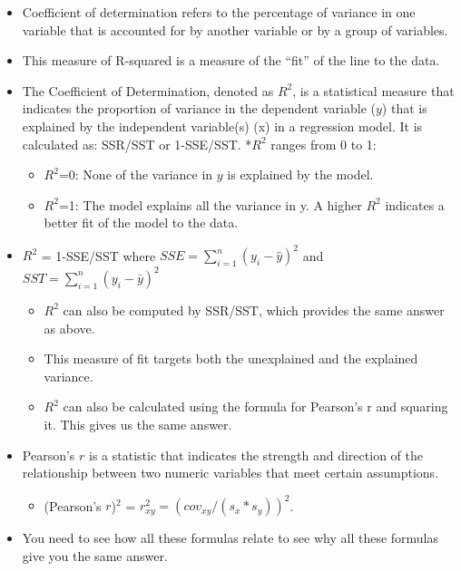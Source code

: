 \documentclass[
  letterpaper,
  DIV=11,
  numbers=noendperiod]{scrreprt}
\providecommand{\tightlist}{%
  \setlength{\itemsep}{0pt}\setlength{\parskip}{0pt}}\usepackage{longtable,booktabs,array}
\begin{document}
\begin{itemize}
\item
  Coefficient of determination refers to the percentage of variance in
  one variable that is accounted for by another variable or by a group
  of variables.
\item
  This measure of R-squared is a measure of the ``fit'' of the line to
  the data.
\item
  The Coefficient of Determination, denoted as \(R^2\), is a statistical
  measure that indicates the proportion of variance in the dependent
  variable (\(y\)) that is explained by the independent variable(s) (x)
  in a regression model. It is calculated as: SSR/SST or 1-SSE/SST.
  *\(R^2\) ranges from 0 to 1:

  \begin{itemize}
  \tightlist
  \item
    \(R^2\)=0: None of the variance in \(y\) is explained by the model.
  \item
    \(R^2\)=1: The model explains all the variance in y. A higher
    \(R^2\) indicates a better fit of the model to the data.
  \end{itemize}
\item
  \(R^2\) = 1-SSE/SST where \(SSE = \sum^n_{i=1}(y_i - \hat{y})^2\) and
  \(SST = \sum^n_{i=1}(y_i - \bar{y})^2\)

  \begin{itemize}
  \tightlist
  \item
    \(R^2\) can also be computed by SSR/SST, which provides the same
    answer as above.
  \item
    This measure of fit targets both the unexplained and the explained
    variance.
  \item
    \(R^2\) can also be calculated using the formula for Pearson's r and
    squaring it. This gives us the same answer.
  \end{itemize}
\item
  Pearson's \(r\) is a statistic that indicates the strength and
  direction of the relationship between two numeric variables that meet
  certain assumptions.

  \begin{itemize}
  \tightlist
  \item
    (Pearson's \(r\))\(^2\) = \(r^2_{xy} = (cov_{xy}/(s_x*s_y))^2\).
  \end{itemize}
\item
  You need to see how all these formulas relate to see why all these
  formulas give you the same answer.
\end{itemize}
\end{document}
